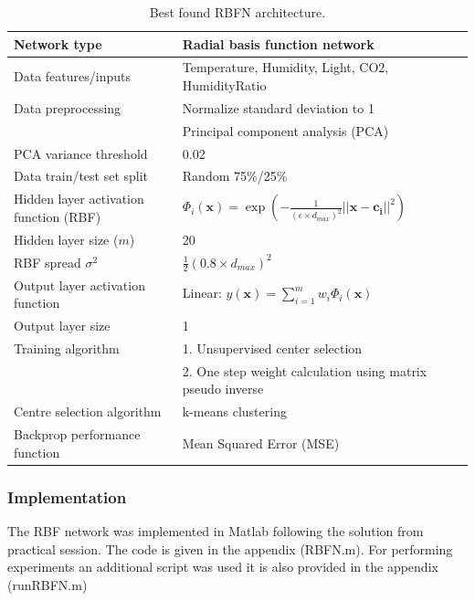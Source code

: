 \documentclass[a4paper, 11pt]{article}
\begin{document}
\begin{table}[h!]
\centering
\begin{tabular}{|l l|} 
 \hline
 Network type & Radial basis function network  \\ 
 \hline
 Data features/inputs & Temperature, Humidity, Light, CO2, HumidityRatio\\
 Data preprocessing & Normalize standard deviation to 1 \\
 & Principal component analysis (PCA) \\
 PCA variance threshold & 0.02 \\ 
 Data train/test set split & Random 75\%/25\% \\
 \hline
 Hidden layer activation function (RBF) & $
\Phi_i(\boldsymbol{x}) = \exp\left(-\frac{1}{(\epsilon \times d_{max})^2} \lvert\lvert \boldsymbol{x} -  \boldsymbol{c_i} \rvert\rvert ^2\right)  
$  \\
 Hidden layer size ($m$) & 20  \\
 RBF spread $\sigma^2$ & $\frac{1}{2}(0.8 \times d_{max})^2$   \\
 \hline
 Output layer activation function & Linear: $y(\boldsymbol{x}) = \displaystyle\sum_{i=1}^{m} w_i \Phi_i(\boldsymbol{x})$ \\
 Output layer size & 1 \\
 \hline
 Training algorithm & 1. Unsupervised center selection \\ 
 & 2. One step weight calculation using matrix pseudo inverse  \\
 Centre selection algorithm & k-means clustering \\
 Backprop performance function & Mean Squared Error (MSE)  \\ [1ex] 
 \hline
\end{tabular}
\caption{Best found RBFN architecture.}
\label{table:architecture}
\end{table}

\subsubsection{Implementation}
The RBF network was implemented in Matlab following the solution from practical session. The code is given in the appendix (RBFN.m). For performing experiments an additional script was used it is also provided in the appendix (runRBFN.m)
\end{document}
